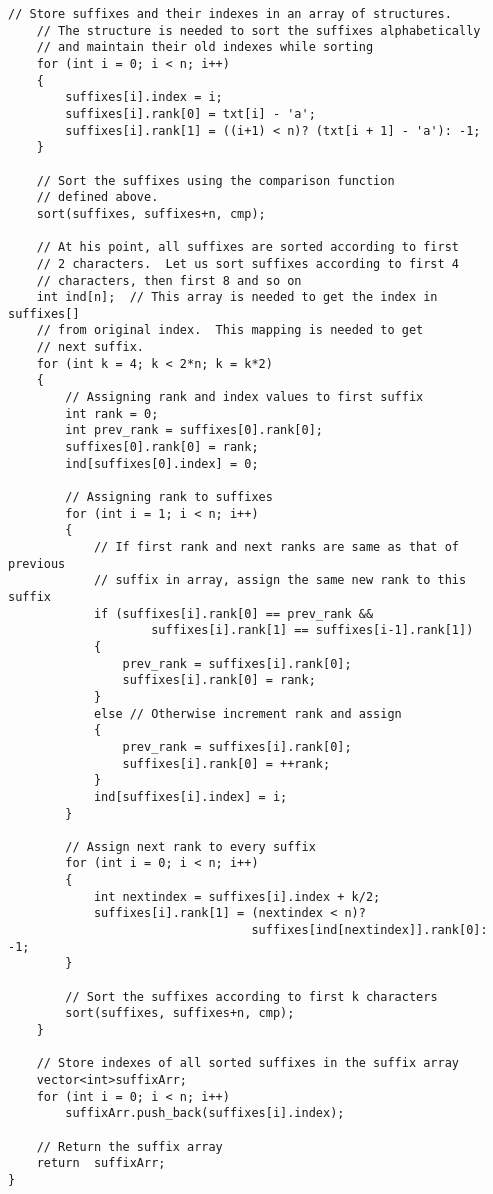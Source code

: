 \documentclass[10pt]{article}
\begin{document}
\begin{multicols*}{2}
\begin{lstlisting}[style=compactcpp]
    // Store suffixes and their indexes in an array of structures.
    // The structure is needed to sort the suffixes alphabetically
    // and maintain their old indexes while sorting
    for (int i = 0; i < n; i++)
    {
        suffixes[i].index = i;
        suffixes[i].rank[0] = txt[i] - 'a';
        suffixes[i].rank[1] = ((i+1) < n)? (txt[i + 1] - 'a'): -1;
    }
 
    // Sort the suffixes using the comparison function
    // defined above.
    sort(suffixes, suffixes+n, cmp);
 
    // At his point, all suffixes are sorted according to first
    // 2 characters.  Let us sort suffixes according to first 4
    // characters, then first 8 and so on
    int ind[n];  // This array is needed to get the index in suffixes[]
    // from original index.  This mapping is needed to get
    // next suffix.
    for (int k = 4; k < 2*n; k = k*2)
    {
        // Assigning rank and index values to first suffix
        int rank = 0;
        int prev_rank = suffixes[0].rank[0];
        suffixes[0].rank[0] = rank;
        ind[suffixes[0].index] = 0;
 
        // Assigning rank to suffixes
        for (int i = 1; i < n; i++)
        {
            // If first rank and next ranks are same as that of previous
            // suffix in array, assign the same new rank to this suffix
            if (suffixes[i].rank[0] == prev_rank &&
                    suffixes[i].rank[1] == suffixes[i-1].rank[1])
            {
                prev_rank = suffixes[i].rank[0];
                suffixes[i].rank[0] = rank;
            }
            else // Otherwise increment rank and assign
            {
                prev_rank = suffixes[i].rank[0];
                suffixes[i].rank[0] = ++rank;
            }
            ind[suffixes[i].index] = i;
        }
 
        // Assign next rank to every suffix
        for (int i = 0; i < n; i++)
        {
            int nextindex = suffixes[i].index + k/2;
            suffixes[i].rank[1] = (nextindex < n)?
                                  suffixes[ind[nextindex]].rank[0]: -1;
        }
 
        // Sort the suffixes according to first k characters
        sort(suffixes, suffixes+n, cmp);
    }
 
    // Store indexes of all sorted suffixes in the suffix array
    vector<int>suffixArr;
    for (int i = 0; i < n; i++)
        suffixArr.push_back(suffixes[i].index);
 
    // Return the suffix array
    return  suffixArr;
}
 

\end{lstlisting}
\end{multicols*}
\end{document}
